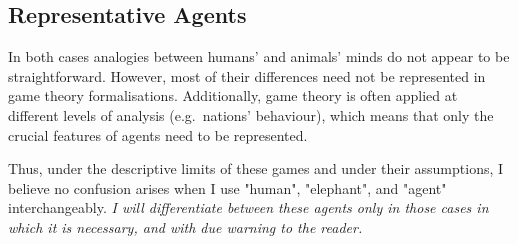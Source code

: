 \subsection{Representative Agents}
In both cases analogies between humans' and animals' minds do not appear to be straightforward. However, most of their differences need not be represented in game theory formalisations. Additionally, game theory is often applied at different levels of analysis (e.g.\ nations' behaviour), which means that only the crucial features of agents need to be represented.

\vspace*{1em}
Thus, under the descriptive limits of these games and under their assumptions, I believe no confusion arises when I use "human", "elephant", and "agent" interchangeably. \textit{I will differentiate between these agents only in those cases in which it is necessary, and with due warning to the reader.}